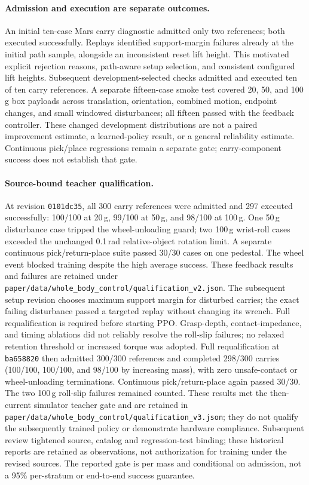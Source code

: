 \paragraph{Admission and execution are separate outcomes.}
An initial ten-case Mars carry diagnostic admitted only two references; both
executed successfully. Replays identified support-margin failures already at
the initial path sample, alongside an inconsistent reset lift height.
This motivated explicit rejection reasons, path-aware setup selection, and
consistent configured lift heights. Subsequent development-selected checks
admitted and executed ten of ten carry references. A separate fifteen-case
smoke test covered 20, 50, and 100\,g box payloads across translation,
orientation, combined motion, endpoint changes, and small windowed disturbances;
all fifteen passed with the feedback controller. These changed development
distributions are not a paired improvement estimate, a learned-policy result,
or a general reliability estimate. Continuous pick/place regressions remain
a separate gate; carry-component success does not establish that gate.

\paragraph{Source-bound teacher qualification.}
At revision \texttt{0101dc35}, all 300 carry references were admitted and
297 executed successfully: 100/100 at 20\,g, 99/100 at 50\,g, and 98/100 at
100\,g. One 50\,g disturbance case tripped the wheel-unloading guard; two
100\,g wrist-roll cases exceeded the unchanged 0.1\,rad relative-object rotation
limit. A separate continuous pick/return-place suite passed 30/30 cases on one
pedestal. The wheel event blocked training despite the high average success.
These feedback results and failures are retained under
\texttt{paper/data/whole\_body\_control/qualification\_v2.json}.
The subsequent setup revision chooses maximum support margin for disturbed
carries; the exact failing disturbance passed a targeted replay without changing
its wrench. Full requalification is required before starting PPO. Grasp-depth,
contact-impedance, and timing ablations did not reliably resolve the roll-slip
failures; no relaxed retention threshold or increased torque was adopted.
Full requalification at \texttt{ba658820} then admitted 300/300 references and
completed 298/300 carries (100/100, 100/100, and 98/100 by increasing mass), with
zero unsafe-contact or wheel-unloading terminations. Continuous pick/return-place
again passed 30/30. The two 100\,g roll-slip failures remained counted. These
results met the then-current simulator teacher gate and are retained in
\texttt{paper/data/whole\_body\_control/qualification\_v3.json}; they do not
qualify the subsequently trained policy or demonstrate hardware compliance. Subsequent
review tightened source, catalog and regression-test binding; these historical
reports are retained as observations, not authorization for training under the
revised sources. The reported gate is per mass and conditional on admission,
not a 95\% per-stratum or end-to-end success guarantee.

